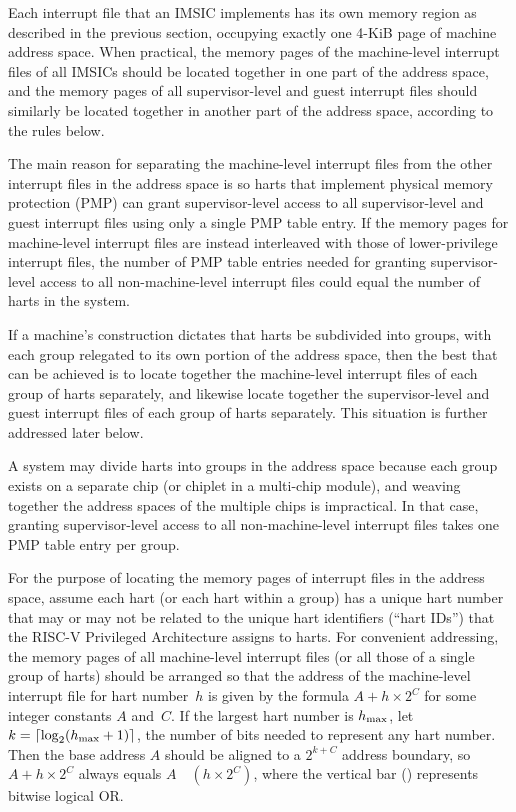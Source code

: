 Each interrupt file that an IMSIC implements has its own memory
region as described in the previous section, occupying exactly one
\mbox{4-KiB} page of machine address space.
When practical, the memory pages of the machine-level interrupt files
of all IMSICs should be located together in one part of the address
space, and the memory pages of all supervisor-level and guest interrupt
files should similarly be located together in another part of the
address space, according to the rules below.

\begin{commentary}
The main reason for separating the machine-level interrupt files
from the other interrupt files in the address space is so harts that
implement physical memory protection (PMP) can grant supervisor-level
access to all supervisor-level and guest interrupt files using only a
single PMP table entry.
If the memory pages for machine-level interrupt files are instead
interleaved with those of lower-privilege interrupt files, the number
of PMP table entries needed for granting supervisor-level access to all
non-machine-level interrupt files could equal the number of harts in
the system.
\end{commentary}

If a machine's construction dictates that harts be subdivided into
groups, with each group relegated to its own portion of the address
space, then the best that can be achieved is to locate together the
machine-level interrupt files of each group of harts separately, and
likewise locate together the supervisor-level and guest interrupt files
of each group of harts separately.
This situation is further addressed later below.

\begin{commentary}
A system may divide harts into groups in the address space because each
group exists on a separate chip (or chiplet in a multi-chip module),
and weaving together the address spaces of the multiple chips is
impractical.
In that case, granting supervisor-level access to all non-machine-level
interrupt files takes one PMP table entry per group.
\end{commentary}

For the purpose of locating the memory pages of interrupt files in the
address space, assume each hart (or each hart within a group) has a
unique hart number that may or may not be related to the unique hart
identifiers (``hart IDs'') that the RISC-V Privileged Architecture
assigns to harts.
For convenient addressing, the memory pages of all machine-level
interrupt files (or all those of a single group of harts) should be
arranged so that the address of the machine-level interrupt file for
hart number~$h$ is given by the formula ${A+h\times\mbox{2}^{C}}$ for
some integer constants $A$ and~$C$.
If the largest hart number is $h_{\rm max}$, let
${k = \lceil\log_{2}(h_{\rm max}+\mbox{1})\rceil}$, the number of bits
needed to represent any hart number.
Then the base address $A$ should be aligned to a $\mbox{2}^{k+C}$
address boundary, so ${A+h\times\mbox{2}^{C}}$ always equals
$A$~\z{|}~${(h\times\mbox{2}^{C})}$, where the vertical bar (\z{|})
represents bitwise logical OR.

